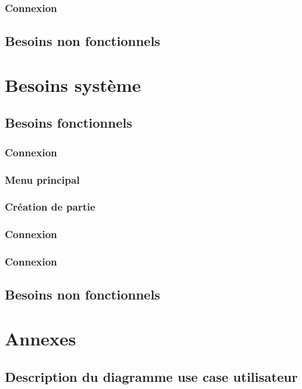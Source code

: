 \documentclass[utf8]{article}
\begin{document}
\subsubsection{Connexion}
\subsection{Besoins non fonctionnels}

\section{Besoins système}
\subsection{Besoins fonctionnels}
\subsubsection{Connexion}
\subsubsection{Menu principal}
\subsubsection{Création de partie}
\subsubsection{Connexion}
\subsubsection{Connexion}
\subsection{Besoins non fonctionnels}

\newpage
 \section{Annexes}
\subsection{ Description du diagramme use case utilisateur}
\end{document}
